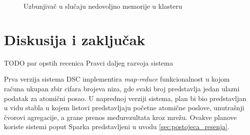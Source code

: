 \documentclass[12pt,oneside]{memoir}
\begin{document}
\begin{figure}[!ht]
  \centering
  \caption{Uzbunjivač u slučaju nedovoljno memorije u klasteru}
  \label{fig:alertmemory}
\end{figure}


\chapter{Diskusija i zaključak}
\label{chp:diskusijaizakljucak}

TODO par opstih recenica Pravci daljeg razvoja sistema

Prva verzija sistema DSC implementira \emph{map-reduce} funkcionalnost u kojom računa ukupan zbir cifara brojeva niza, gde svaki broj predstavlja jedan ulazni podatak za atomični posao. U naprednoj verziji sistema, plan bi bio predstavljan u vidu stabla u kojem listovi predstavljaju početne atomične poslove, unutrašnji čvorovi agregacije, a grane prenos međurezultata kroz mrežu. Ovakve planove koriste sistemi poput Sparka \cite{Spark} predstavljeni u uvodu \ref{sec:postojeca_resenja}.
\end{document}
